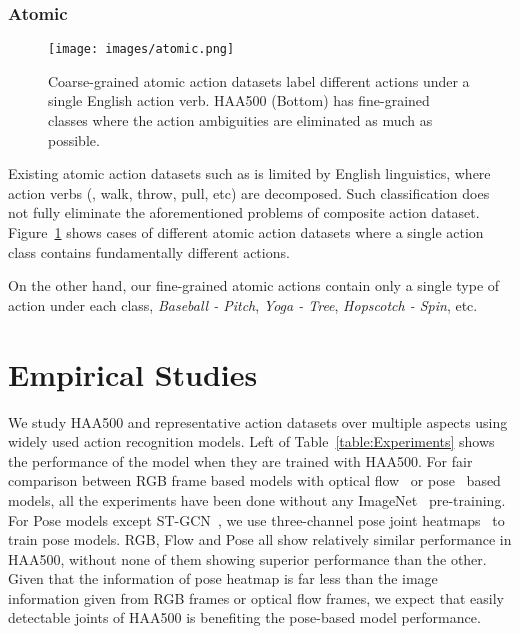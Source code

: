 \documentclass[10pt,twocolumn,letterpaper]{article}
\begin{document}
\subsubsection{Atomic}

\begin{figure}[!t]
\begin{center}
\texttt{[image: images/atomic.png]}
\caption{Coarse-grained atomic action datasets label different actions under a single English action verb. HAA500 (Bottom) has fine-grained classes where the action ambiguities are eliminated as much as possible.}
\label{fig:comparison_atomicity}

\end{center}
\vspace{-1em}
\end{figure}

Existing atomic action datasets such as \cite{ava_speech,AVA,momentsintime} is limited by English linguistics, where action verbs (\eg, walk, throw, pull, etc) are decomposed. Such classification does not fully eliminate the aforementioned problems of composite action dataset. Figure~\ref{fig:comparison_atomicity} shows cases of different atomic action datasets where a single action class contains fundamentally different actions. 

On the other hand, our fine-grained atomic actions contain only a single type of action under each class, \eg \textit{Baseball - Pitch}, \textit{Yoga - Tree}, \textit{Hopscotch - Spin}, etc. 


\section{Empirical Studies}

We study HAA500 and  representative action datasets over multiple aspects using widely used action recognition models. Left of Table~\ref{table:Experiments} shows the performance of the model when they are trained with HAA500. For fair comparison between RGB frame based models with optical flow~\cite{flownet2} or pose~\cite{alphapose} based models, all the experiments have been done without any ImageNet~\cite{imagenet} pre-training. For Pose models except ST-GCN~\cite{stgcn}, we use three-channel pose joint heatmaps~\cite{alphapose} to train pose models. RGB, Flow and Pose all show relatively similar performance in HAA500, without none of them showing superior performance than the other.  Given that the information of pose heatmap is far less than the image information given from RGB frames or optical flow frames, we expect that easily detectable joints of HAA500 is benefiting the pose-based model performance. 
\end{document}
